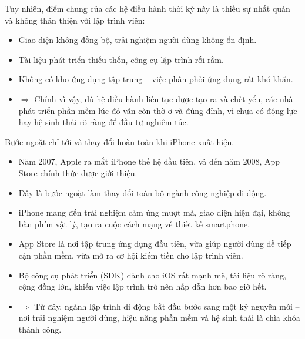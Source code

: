     \begin{flushleft}
      \hspace*{0.8cm}Tuy nhiên, điểm chung của các hệ điều hành thời kỳ này là thiếu sự nhất quán và không thân thiện với lập trình viên:
      \setlength{\leftmargini}{1.5cm}
      \begin{itemize}
          \item Giao diện không đồng bộ, trải nghiệm người dùng không ổn định.
          \item Tài liệu phát triển thiếu thốn, công cụ lập trình rối rắm.
          \item Không có kho ứng dụng tập trung – việc phân phối ứng dụng rất khó khăn.
          \item[]$\Rightarrow$ Chính vì vậy, dù hệ điều hành liên tục được tạo ra và chết yểu, các nhà phát triển phần mềm lúc đó vẫn còn thờ ơ và đủng đỉnh, vì chưa có động lực hay hệ sinh thái rõ ràng để đầu tư nghiêm túc.
      \end{itemize}
    \end{flushleft}

    \begin{flushleft}
      \hspace*{0.8cm}Bước ngoặt chỉ tới và thay đổi hoàn toàn khi iPhone xuất hiện.
      \setlength{\leftmargini}{1.5cm}
      \begin{itemize}
          \item Năm 2007, Apple ra mắt iPhone thế hệ đầu tiên, và đến năm 2008, App Store chính thức được giới thiệu.
          \item Đây là bước ngoặt làm thay đổi toàn bộ ngành công nghiệp di động.
          \item iPhone mang đến trải nghiệm cảm ứng mượt mà, giao diện hiện đại, không bàn phím vật lý, tạo ra cuộc cách mạng về thiết kế smartphone.
          \item App Store là nơi tập trung ứng dụng đầu tiên, vừa giúp người dùng dễ tiếp cận phần mềm, vừa mở ra cơ hội kiếm tiền cho lập trình viên.
          \item Bộ công cụ phát triển (SDK) dành cho iOS rất mạnh mẽ, tài liệu rõ ràng, cộng đồng lớn, khiến việc lập trình trở nên hấp dẫn hơn bao giờ hết.
          \item[]$\Rightarrow$ Từ đây, ngành lập trình di động bắt đầu bước sang một kỷ nguyên mới – nơi trải nghiệm người dùng, hiệu năng phần mềm và hệ sinh thái là chìa khóa thành công.
      \end{itemize}
    \end{flushleft}

